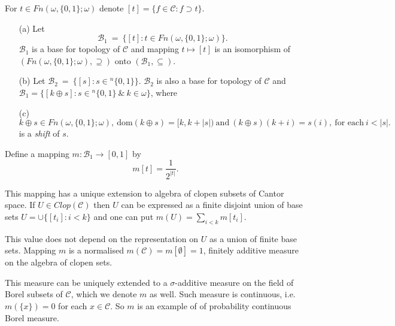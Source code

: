 For $t \in Fn(\omega,\{0,1\};\omega)$ denote
$[t] = \{f \in \mathcal C : f \supset t\}$.
\begin{itemize}
 \item[(a)] Let
	$$
	\mathcal B_1 \ = \ \{[t] : t \in Fn(\omega,\{0,1\};\omega) \}.
	$$
	$\mathcal B_1$ is a base for topology of $\mathcal C$ and mapping
	$t \mapsto [t]$ is an isomorphism of
	$(Fn(\omega,\{0,1\};\omega), \supseteq)$ onto $(\mathcal B_1,\subseteq)$.
 \item[(b)] Let $\mathcal B_2 \ = \ \{[s] : s \in {}^n \{0,1 \} \}$.
	$\mathcal B_2$ is also a base for topology of $\mathcal C$ and
	$\mathcal B_1 = \{ [ k \oplus s ] : s \in {}^n \{0,1 \} \ \& \ k \in \omega \}$,
	where
 \item[(c)] $
	k \oplus s \in Fn(\omega,\{0,1\};\omega), \ \mbox{dom}(k \oplus s) = [k,k+|s|) \
	\mbox{and} \ (k \oplus s)(k+i) = s(i), \ \mbox{for each} \ i < |s|.
	$ is a \emph{shift} of $s$.
\end{itemize}

Define a mapping $m: \mathcal B_1 \to [0,1]$ by
$$
m[t] = \dfrac{1}{2^|t|}.
$$

This mapping has a unique extension to algebra of clopen subsets
of Cantor space. If $U \in Clop(\mathcal C)$ then $U$
can be expressed as a finite disjoint union of  base sets
$U = \cup \{[t_i] : i < k  \}$ and one can put
$m(U) = \sum_{i < k} m[t_i]$.

This value does not depend on the representation on $U$ as
a union of finite base sets. Mapping $m$ is a normalised
$m(\mathcal C) = m[\emptyset] = 1$, finitely additive measure
on the algebra of clopen sets.

This measure can be uniquely extended to a
$\sigma$-additive measure on the field of Borel subsets of $\mathcal C$,
which we denote $m$ as well. Such measure is continuous,
i.e. $m(\{x\}) = 0$ for each $x \in \mathcal C$. So $m$ is
an example of of probability continuous Borel measure.

%

